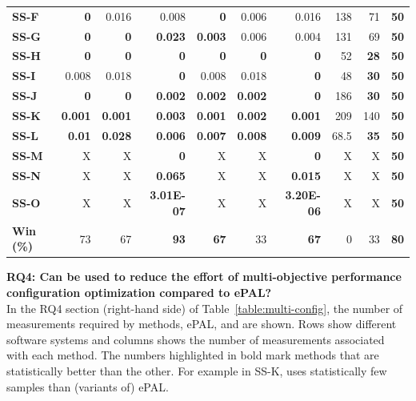 \begin{table}[]
\begin{tabular}{@{}lrrrrrrrrr@{}}
\textbf{SS-F} & \textbf{0} & 0.016 & 0.008 & \textbf{0} & 0.006 & 0.016 & 138 & 71 & \textbf{50} \\
\textbf{SS-G} & \textbf{0} & \textbf{0} & \textbf{0.023} & \textbf{0.003} & 0.006 & 0.004 & 131 & 69 & \textbf{50} \\
\textbf{SS-H} & \textbf{0} & \textbf{0} & \textbf{0} & \textbf{0} & \textbf{0} & \textbf{0} & 52 & \textbf{28} & \textbf{50} \\
\textbf{SS-I} & 0.008 & 0.018 & \textbf{0} & 0.008 & 0.018 & \textbf{0} & 48 & \textbf{30} & \textbf{50} \\
\textbf{SS-J} & \textbf{0} & \textbf{0} & \textbf{0.002} & \textbf{0.002} & \textbf{0.002} & \textbf{0} & 186 & \textbf{30} & \textbf{50} \\
\textbf{SS-K} & \textbf{0.001} & \textbf{0.001} & \textbf{0.003} & \textbf{0.001} & \textbf{0.002} & \textbf{0.001} & 209 & 140 & \textbf{50} \\
\textbf{SS-L} & \textbf{0.01} & \textbf{0.028} & \textbf{0.006} & \textbf{0.007} & \textbf{0.008} & \textbf{0.009} & 68.5 & \textbf{35} & \textbf{50} \\
\textbf{SS-M} & X & X & \textbf{0} & X & X & \textbf{0} & X & X & \textbf{50} \\
\textbf{SS-N} & X & X & \textbf{0.065} & X & X & \textbf{0.015} & X & X & \textbf{50} \\
\textbf{SS-O} & X & X & \textbf{3.01E-07} & X & X & \textbf{3.20E-06} & X & X & \textbf{50} \\ \midrule
\textbf{Win (\%)} & 73 & 67 & \textbf{93} & \textbf{67} & 33 & \textbf{67} & 0 & 33 & \textbf{80} \\ \bottomrule
\end{tabular}
\end{table}

\newpage
\noindent\textbf{RQ4: Can \flash be used to reduce the effort of multi-objective performance configuration optimization compared to ePAL?}\\
In the RQ4 section (right-hand side) of Table~\ref{table:multi-config}, the number of measurements required by methods, ePAL, and \flash are shown. Rows show different software systems and columns shows the number of measurements associated with each method. The numbers highlighted in bold mark methods that are statistically better than the other. For example in SS-K, \flash uses statistically few samples than (variants of) ePAL. 

